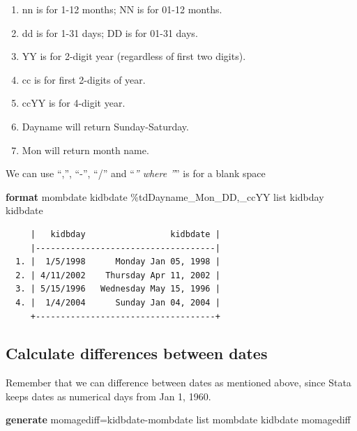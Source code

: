 \documentclass[
]{book}
\newenvironment{Shaded}{\begin{snugshade}}{\end{snugshade}}
\newcommand{\KeywordTok}[1]{\textcolor[rgb]{0.13,0.29,0.53}{\textbf{#1}}}
\newcommand{\NormalTok}[1]{#1}
\newcommand{\OtherTok}[1]{\textcolor[rgb]{0.56,0.35,0.01}{#1}}
\providecommand{\tightlist}{%
  \setlength{\itemsep}{0pt}\setlength{\parskip}{0pt}}
\begin{document}
\begin{enumerate}
\def\labelenumi{\arabic{enumi}.}
\tightlist
\item
  nn is for 1-12 months; NN is for 01-12 months.
\item
  dd is for 1-31 days; DD is for 01-31 days.
\item
  YY is for 2-digit year (regardless of first two digits).
\item
  cc is for first 2-digits of year.
\item
  ccYY is for 4-digit year.
\item
  Dayname will return Sunday-Saturday.
\item
  Mon will return month name.
\end{enumerate}

We can use ``,'', ``-'', ``/'' and ``\emph{'' where ''}'' is for a blank space

\begin{Shaded}
\begin{Highlighting}[]
\KeywordTok{format}\NormalTok{ mombdate kidbdate \%tdDayname\_Mon\_DD,\_ccYY}
\OtherTok{list}\NormalTok{ kidbday kidbdate}
\end{Highlighting}
\end{Shaded}

\begin{verbatim}
     |   kidbday                 kidbdate |
     |------------------------------------|
  1. |  1/5/1998      Monday Jan 05, 1998 |
  2. | 4/11/2002    Thursday Apr 11, 2002 |
  3. | 5/15/1996   Wednesday May 15, 1996 |
  4. |  1/4/2004      Sunday Jan 04, 2004 |
     +------------------------------------+
\end{verbatim}

\subsection{Calculate differences between dates}\label{calculate-differences-between-dates}

Remember that we can difference between dates as mentioned above, since Stata keeps dates as numerical days from Jan 1, 1960.

\begin{Shaded}
\begin{Highlighting}[]
\KeywordTok{generate}\NormalTok{ momagediff=kidbdate{-}mombdate}
\OtherTok{list}\NormalTok{ mombdate kidbdate momagediff}
\end{Highlighting}
\end{Shaded}
\end{document}

